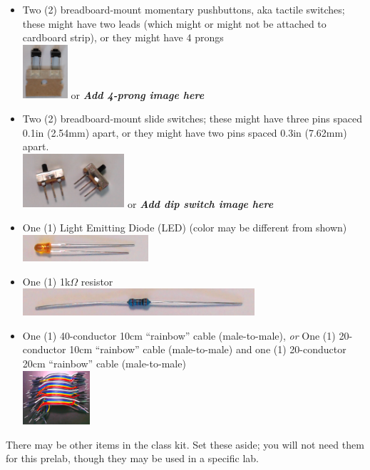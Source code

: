 \begin{itemize}
    \item Two (2) breadboard-mount momentary pushbuttons, aka tactile switches;
        these might have two leads (which might or might not be attached to cardboard strip), or they might have 4 prongs \\
        \includegraphics[height=2cm]{inventory/buttons-2pin} \hspace{1cm} or
        \hspace{1cm} \textbf{\textit{Add 4-prong image here}} %
    \item Two (2) breadboard-mount slide switches;
        these might have three pins spaced 0.1in (2.54mm) apart, or they might have two pins spaced 0.3in (7.62mm) apart. \\
        \includegraphics[height=2cm]{inventory/sliders-spdt} \hspace{1cm} or
        \hspace{1cm} \textbf{\textit{Add dip switch image here}} %
    \displaymoduleitem
    \item One (1) Light Emitting Diode (LED) (color may be different from shown) \\
        \includegraphics[height=1cm]{inventory/led}
    \item One (1) 1k$\Omega$ resistor \\
        \includegraphics[height=1cm]{inventory/resistor}
    \item One (1) 40-conductor 10cm ``rainbow'' cable (male-to-male), \textit{or} One (1) 20-conductor 10cm ``rainbow'' cable (male-to-male) and one (1) 20-conductor 20cm ``rainbow'' cable (male-to-male) \\
        \includegraphics[height=2cm]{inventory/mm-cable}
    \fmcableitem
\end{itemize}

There may be other items in the class kit.
Set these aside;
you will not need them for this prelab, though they may be used in a specific lab.
